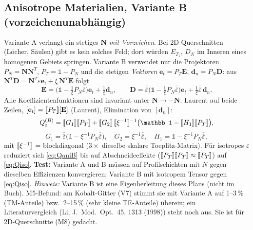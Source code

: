 \subsection{Anisotrope Materialien, Variante B (vorzeichenunabhängig)}
Variante A verlangt ein stetiges $\mathbf N$ \emph{mit Vorzeichen}. Bei 2D-Querschnitten (Löcher, Säulen)
gibt es kein solches Feld; dort würden $E_{T_1}$, $D_N$ im Inneren eines homogenen Gebiets springen. Variante B
verwendet nur die Projektoren $P_N=\mathbf N\mathbf N^T$, $P_T=\mathbb 1-P_N$ und die stetigen
\emph{Vektoren} $\mathbf e_t=P_T\mathbf E$, $\mathbf d_n=P_N\mathbf D$:
aus $\mathbf N^T\mathbf D=\mathbf N^T\overline{\overline\varepsilon}\mathbf e_t+\xi\,\mathbf N^T\mathbf E$ folgt
\begin{equation}
  \mathbf E=\Big(\mathbb 1-\tfrac1\xi P_N\overline{\overline\varepsilon}\Big)\mathbf e_t+\tfrac1\xi\mathbf d_n,\qquad
  \mathbf D=\overline{\overline\varepsilon}\Big(\mathbb 1-\tfrac1\xi P_N\overline{\overline\varepsilon}\Big)\mathbf e_t+\tfrac1\xi\overline{\overline\varepsilon}\,\mathbf d_n .
  \label{eq:projector}
\end{equation}
Alle Koeffizientenfunktionen sind invariant unter $\mathbf N\to-\mathbf N$. Laurent auf beide
Zeilen, $[\mathbf e_t]=[\![P_T]\!][\mathbf E]$ (Laurent), Elimination von $[\mathbf d_n]$:
\begin{equation}
  Q_\varepsilon^{(B)}=\tp{G_1}\tp{P_T}+\tp{G_2}\,\tp{\xi^{-1}}^{-1}\big(\mathbb 1-\tp{H_1}\tp{P_T}\big),
  \label{eq:QaniB}
\end{equation}
\[
  G_1=\overline{\overline\varepsilon}\big(\mathbb 1-\xi^{-1}P_N\overline{\overline\varepsilon}\big),\quad
  G_2=\xi^{-1}\overline{\overline\varepsilon},\quad H_1=\mathbb 1-\xi^{-1}P_N\overline{\overline\varepsilon},
\]
mit $[\![\xi^{-1}]\!]$ = blockdiagonal ($3\times$ dieselbe skalare Toeplitz-Matrix). Für isotropes $\varepsilon$
reduziert sich \eqref{eq:QaniB} bis auf Abschneideeffekte ($[\![P_T]\!][\![P_T]\!]\approx[\![P_T]\!]$) auf
\eqref{eq:Qiso}. \textbf{Test:} Variante A und B müssen auf Profilschichten mit $N$ gegen dieselben
Effizienzen konvergieren; Variante B mit isotropem Tensor gegen \eqref{eq:Qiso}.
\emph{Hinweis:} Variante B ist eine Eigenherleitung dieses Plans (nicht im Buch). M5-Befund: am Kobalt-Gitter
(V7) stimmt sie mit Variante A auf 1--3\,\% (TM-Anteile) bzw.\ 2--15\,\% (sehr kleine TE-Anteile) überein; ein
Literaturvergleich (Li, J.\ Mod.\ Opt.\ 45, 1313 (1998)) steht noch aus. Sie ist für 2D-Querschnitte (M8) gedacht.


